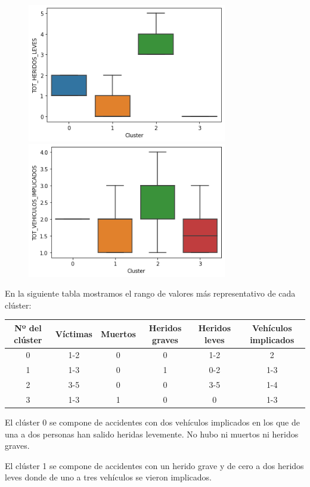 \documentclass[a4]{article}
\begin{document}
\begin{figure}[H]
  \includegraphics[width=87mm]{imagenes/c3_kmeans_hl}
  \includegraphics[width=87mm]{imagenes/c3_kmeans_vi}
\end{figure}

\newpage
En la siguiente tabla mostramos el rango de valores más representativo de cada clúster:

\begin{center}
\begin{tabular}{|c|c|c|c|c|c|}
\hline
\multicolumn{1}{|c|}{\textbf{Nº del clúster}} & \textbf{Víctimas} & \textbf{Muertos} & \textbf{Heridos graves} & \textbf{Heridos leves} & \textbf{Vehículos implicados}\\ \hline
  0  & 1-2 & 0 & 0 & 1-2 & 2   \\ \hline
  1  & 1-3 & 0 & 1 & 0-2 & 1-3 \\ \hline
  2  & 3-5 & 0 & 0 & 3-5 & 1-4 \\ \hline
  3  & 1-3 & 1 & 0 & 0   & 1-3 \\ \hline
\end{tabular}
\end{center}

El clúster 0 se compone de accidentes con dos vehículos implicados en los que de una a dos personas han salido heridas levemente. No hubo ni muertos ni heridos graves.

El clúster 1 se compone de accidentes con un herido grave y de cero a dos heridos leves donde de uno a tres vehículos se vieron implicados.
\end{document}
